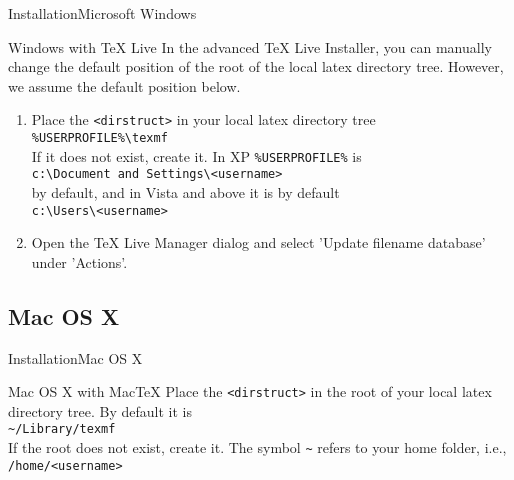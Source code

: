 \documentclass[10pt]{beamer}
\begin{document}
\begin{frame}{Installation}{Microsoft Windows}
  \begin{block}{Windows with TeX Live}
    In the advanced TeX Live Installer, you can manually change the default position of the root of the local latex directory tree. However, we assume the default position below.
    \begin{enumerate}
      \item Place the {\tt <dirstruct>} in your local latex directory tree\\
        {\tt \%USERPROFILE\%\textbackslash texmf}\\
        If it does not exist, create it. In XP {\tt \%USERPROFILE\%} is\\
      {\tt c:\textbackslash Document and Settings\textbackslash<username>}\\
      by default, and in Vista and above it is by default\\
      {\tt c:\textbackslash Users\textbackslash<username>}
      \item Open the TeX Live Manager dialog and select 'Update filename database' under 'Actions'.
    \end{enumerate}
  \end{block}
\end{frame}

\subsection{Mac OS X}
\begin{frame}{Installation}{Mac OS X}
  \begin{block}{Mac OS X with MacTeX}
     Place the {\tt <dirstruct>} in the root of your local latex directory tree. By default it is\\
        {\tt \textasciitilde /Library/texmf}\\
        If the root does not exist, create it. The symbol {\tt \textasciitilde} refers to your home folder, i.e., {\tt /home/<username>}
  \end{block}
\end{frame}
\end{document}
